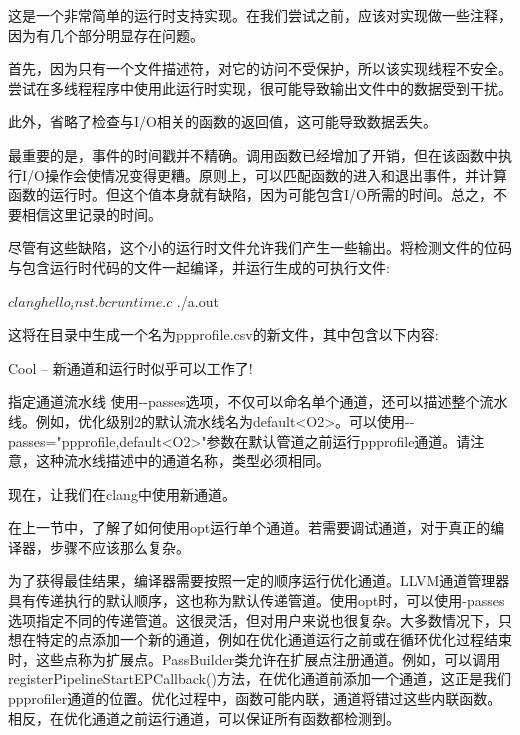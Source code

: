 这是一个非常简单的运行时支持实现。在我们尝试之前，应该对实现做一些注释，因为有几个部分明显存在问题。

首先，因为只有一个文件描述符，对它的访问不受保护，所以该实现线程不安全。尝试在多线程程序中使用此运行时实现，很可能导致输出文件中的数据受到干扰。

此外，省略了检查与I/O相关的函数的返回值，这可能导致数据丢失。

最重要的是，事件的时间戳并不精确。调用函数已经增加了开销，但在该函数中执行I/O操作会使情况变得更糟。原则上，可以匹配函数的进入和退出事件，并计算函数的运行时。但这个值本身就有缺陷，因为可能包含I/O所需的时间。总之，不要相信这里记录的时间。

尽管有这些缺陷，这个小的运行时文件允许我们产生一些输出。将检测文件的位码与包含运行时代码的文件一起编译，并运行生成的可执行文件:

\begin{shell}
$ clang hello_inst.bc runtime.c
$ ./a.out
\end{shell}

这将在目录中生成一个名为ppprofile.csv的新文件，其中包含以下内容:


Cool – 新通道和运行时似乎可以工作了!

\begin{myTip}{指定通道流水线}
使用-{}-passes选项，不仅可以命名单个通道，还可以描述整个流水线。例如，优化级别2的默认流水线名为default<O2>。可以使用-{}-passes="ppprofile,default<O2>"参数在默认管道之前运行ppprofile通道。请注意，这种流水线描述中的通道名称，类型必须相同。
\end{myTip}

现在，让我们在clang中使用新通道。


在上一节中，了解了如何使用opt运行单个通道。若需要调试通道，对于真正的编译器，步骤不应该那么复杂。

为了获得最佳结果，编译器需要按照一定的顺序运行优化通道。LLVM通道管理器具有传递执行的默认顺序，这也称为默认传递管道。使用opt时，可以使用-passes选项指定不同的传递管道。这很灵活，但对用户来说也很复杂。大多数情况下，只想在特定的点添加一个新的通道，例如在优化通道运行之前或在循环优化过程结束时，这些点称为扩展点。PassBuilder类允许在扩展点注册通道。例如，可以调用registerPipelineStartEPCallback()方法，在优化通道前添加一个通道，这正是我们ppprofiler通道的位置。优化过程中，函数可能内联，通道将错过这些内联函数。相反，在优化通道之前运行通道，可以保证所有函数都检测到。

